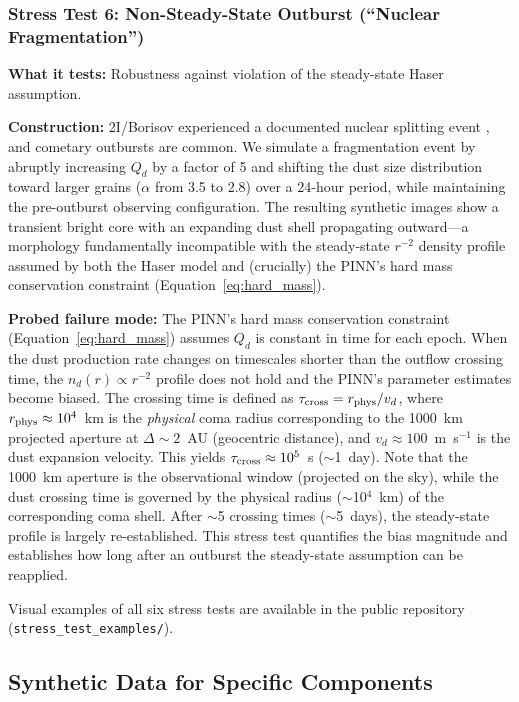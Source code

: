 \documentclass[usenatbib]{mnras}
\begin{document}
\subsubsection{Stress Test 6: Non-Steady-State Outburst (``Nuclear Fragmentation'')}

\textbf{What it tests:} Robustness against violation of the steady-state Haser assumption.

\textbf{Construction:} 2I/Borisov experienced a documented nuclear splitting event \citep{jewitt20}, and cometary outbursts are common. We simulate a fragmentation event by abruptly increasing $Q_d$ by a factor of 5 and shifting the dust size distribution toward larger grains ($\alpha$ from 3.5 to 2.8) over a 24-hour period, while maintaining the pre-outburst observing configuration. The resulting synthetic images show a transient bright core with an expanding dust shell propagating outward---a morphology fundamentally incompatible with the steady-state $r^{-2}$ density profile assumed by both the Haser model and (crucially) the PINN's hard mass conservation constraint (Equation~\ref{eq:hard_mass}).

\textbf{Probed failure mode:} The PINN's hard mass conservation constraint (Equation~\ref{eq:hard_mass}) assumes $Q_d$ is constant in time for each epoch. When the dust production rate changes on timescales shorter than the outflow crossing time, the $n_d(r) \propto r^{-2}$ profile does not hold and the PINN's parameter estimates become biased. The crossing time is defined as $\tau_{\rm cross} = r_{\rm phys} / v_d$, where $r_{\rm phys} \approx 10^4$~km is the \textit{physical} coma radius corresponding to the 1000~km projected aperture at $\Delta\sim2$~AU (geocentric distance), and $v_d\approx100$~m~s$^{-1}$ is the dust expansion velocity. This yields $\tau_{\rm cross} \approx 10^5$~s ($\sim$1~day). Note that the 1000~km aperture is the observational window (projected on the sky), while the dust crossing time is governed by the physical radius ($\sim$10$^4$~km) of the corresponding coma shell. After $\sim$5 crossing times ($\sim$5~days), the steady-state profile is largely re-established. This stress test quantifies the bias magnitude and establishes how long after an outburst the steady-state assumption can be reapplied.

Visual examples of all six stress tests are available in the public repository (\texttt{stress\_test\_examples/}).

\subsection{Synthetic Data for Specific Components}
\end{document}
